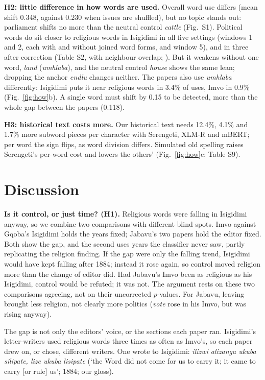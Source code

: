 \documentclass[10pt,letterpaper]{article}
\begin{document}
\textbf{H2: little difference in how words are used.} Overall word use differs (mean shift 0.348, against 0.230 when issues are shuffled), but no topic stands out: parliament shifts no more than the neutral control \emph{cattle} (Fig.~S1). Political words do sit closer to religious words in Isigidimi in all five settings (windows 1 and 2, each with and without joined word forms, and window 5), and in three after correction (Table S2, with neighbour overlap; \citealp{gonen2020}). But it weakens without one word, \emph{land} (\emph{umhlaba}), and the neutral control \emph{house} shows the same lean; dropping the anchor \emph{endlu} changes neither. The papers also use \emph{umhlaba} differently: Isigidimi puts it near religious words in 3.4\% of uses, Imvo in 0.9\% (Fig.~\ref{fig:how}b). A single word must shift by 0.15 to be detected, more than the whole gap between the papers (0.118).

\textbf{H3: historical text costs more.} Our historical text needs 12.4\%, 4.1\% and 1.7\% more subword pieces per character with Serengeti, XLM-R and mBERT; per word the sign flips, as word division differs. Simulated old spelling raises Serengeti's per-word cost and lowers the others' (Fig.~\ref{fig:how}c; Table S9).

\section{Discussion}
\textbf{Is it control, or just time? (H1).} Religious words were falling in Isigidimi anyway, so we combine two comparisons with different blind spots. Imvo against Gqoba's Isigidimi holds the years fixed; Jabavu's two papers hold the editor fixed. Both show the gap, and the second uses years the classifier never saw, partly replicating the religion finding. If the gap were only the falling trend, Isigidimi would have kept falling after 1884; instead it rose again, so control moved religion more than the change of editor did. Had Jabavu's Imvo been as religious as his Isigidimi, control would be refuted; it was not. The argument rests on these two comparisons agreeing, not on their uncorrected $p$-values. For Jabavu, leaving brought less religion, not clearly more politics (\emph{vote} rose in his Imvo, but was rising anyway).

The gap is not only the editors' voice, or the sections each paper ran. Isigidimi's letter-writers used religious words three times as often as Imvo's, so each paper drew on, or chose, different writers. One wrote to Isigidimi: \emph{ilizwi alizanga ukuba silipate, lize ukuba lisipate} (`the Word did not come for us to carry it; it came to carry [or rule] us'; 1884; our gloss).
\end{document}

